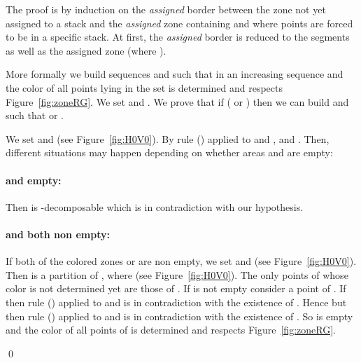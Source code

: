 \documentclass[11pt]{article}
\newenvironment{pf}{{\em \noindent Proof:}}{ \hfill \qed\smallskip}
\newcommand{\rmnum}[1]{\romannumeral #1}
\newcommand{\ascentRG}{increasing sequence \xspace}
\begin{document}
\begin{pf}
The proof is by induction on the {\em assigned} border between the zone not yet assigned to a stack and the {\em assigned} zone containing  and  where points are 
forced to be in a specific stack. 
At first, the {\em assigned} border is reduced to the segments  as well as the assigned zone (where ).

More formally we build sequences  and  such that  in an \ascentRG and the color of all points lying in the set  is determined and respects Figure~\ref{fig:zoneRG}.
We set  and .
We prove that if ( or ) then we can build  and  such that  or .

We set  and  (see Figure~\ref{fig:H0V0}). 
By rule (\rmnum{3}) applied to  and ,  and . 
Then, different situations may happen depending on whether areas  and  are empty:

\paragraph{ and  empty:} Then  is -decomposable which is in contradiction with our hypothesis.

\paragraph{ and  both non empty:} If both of the colored zones  or  are non empty, we set  and  (see Figure~\ref{fig:H0V0}). 
Then  is a partition of , where  (see Figure~\ref{fig:H0V0}). 
The only points of  whose color is not determined yet are those of . 
If  is not empty consider a point  of . 
If  then rule (\rmnum{1}) applied to  and  is in contradiction with the existence of . 
Hence  but then rule (\rmnum{2}) applied to  and  is in contradiction with the existence of . 
So  is empty and the color of all points of  is determined and respects Figure~\ref{fig:zoneRG}.


\end{pf}
\end{document}
